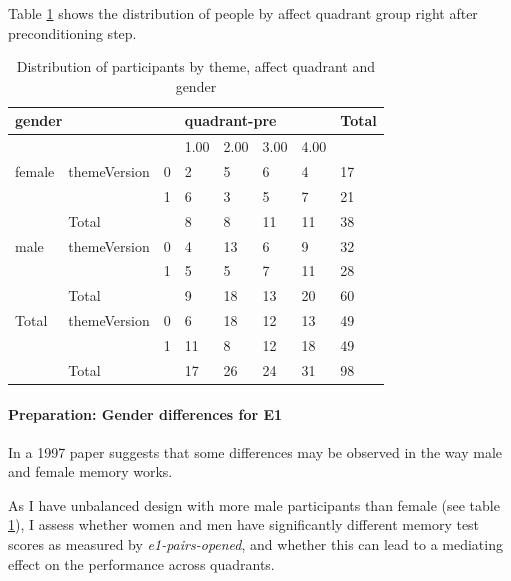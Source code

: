 		Table \ref{tbl:distribution} shows the distribution of people by affect quadrant group right after preconditioning step. 

		\begin{table}[h!]
			\centering
			\begin{tabular}{ll|l|llll|l}
				\hline
				\multicolumn{3}{l}{gender} & \multicolumn{4}{l}{quadrant-pre} & Total \\ \hline
				&              &   & 1.00    & 2.00   & 3.00   & 4.00   &       \\ \hline
				female  & themeVersion & 0 & 2       & 5      & 6      & 4      & 17    \\
				&              & 1 & 6       & 3      & 5      & 7      & 21    \\ \hline
				& Total        &   & 8       & 8      & 11     & 11     & 38    \\ \hline \hline
				male    & themeVersion & 0 & 4       & 13     & 6      & 9      & 32    \\
				&              & 1 & 5       & 5      & 7      & 11     & 28    \\ \hline
				& Total        &   & 9       & 18     & 13     & 20     & 60    \\ \hline \hline
				Total   & themeVersion & 0 & 6       & 18     & 12     & 13     & 49    \\
				&              & 1 & 11      & 8      & 12     & 18     & 49    \\ \hline \hline
				& Total        &   & 17      & 26     & 24     & 31     & 98 	\\ \hline \hline
			\end{tabular}
			\caption{Distribution of participants by theme, affect quadrant and gender}
			\label{tbl:distribution}
		\end{table}
		
		\paragraph{Preparation: Gender differences for E1} \label{sec:gender-differences-E1}
		
		In a 1997 paper \cite{McBurney1997} suggests that some differences may be observed in the way male and female memory works.
		
		As I have unbalanced design with more male participants than female (see table \ref{tbl:distribution}), I assess whether women and men have significantly different memory test scores as measured by \textit{e1-pairs-opened}, and whether this can lead to a mediating effect on the performance across quadrants.
		
